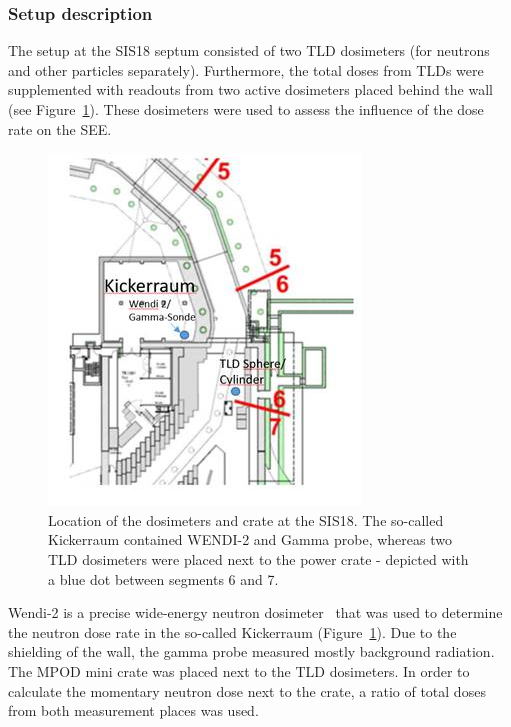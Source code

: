 \subsubsection{Setup description}
The setup at the SIS18 septum consisted of two \gls{TLD} dosimeters (for neutrons and other particles separately). Furthermore, the total doses from TLDs were supplemented with readouts from two active dosimeters placed behind the wall (see Figure~\ref{fig:spec_des}). These dosimeters were used to assess the influence of the dose rate on the \gls{SEE}.
\begin{figure}[!ht]
    \centering
    \includegraphics[width=0.45\columnwidth]{Chapter4/images/septum.jpg}
    \caption{Location of the dosimeters and crate at the SIS18. The so-called Kickerraum contained WENDI-2 and Gamma probe, whereas two TLD dosimeters were placed next to the power crate - depicted with a blue dot between segments 6 and 7.}
    \label{fig:spec_des}
\end{figure}

Wendi-2 is a precise wide-energy neutron dosimeter~\cite{wendi} that was used to determine the neutron dose rate in the so-called Kickerraum (Figure~\ref{fig:spec_des}). Due to the shielding of the wall, the gamma probe measured mostly background radiation. The MPOD mini crate was placed next to the TLD dosimeters. In order to calculate the momentary neutron dose next to the crate, a ratio of total doses from both measurement places was used. 
\newpage
